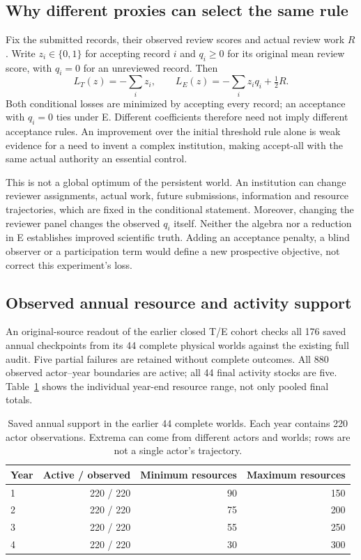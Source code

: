 \subsection{Why different proxies can select the same rule}
Fix the submitted records, their observed review scores and actual review
work $R$. Write $z_i\in\{0,1\}$ for accepting record $i$ and $q_i\geq0$ for
its original mean review score, with $q_i=0$ for an unreviewed record. Then
\begin{equation}
 L_T(z)=-\sum_i z_i,\qquad
 L_E(z)=-\sum_i z_i q_i+\tfrac12 R.
 \label{eq:conditional-accept-all}
\end{equation}
Both conditional losses are minimized by accepting every record; an acceptance
with $q_i=0$ ties under E. Different coefficients therefore need not imply
different acceptance rules. An improvement over the initial threshold rule
alone is weak evidence for a need to invent a complex institution, making
accept-all with the same actual authority an essential control.

This is not a global optimum of the persistent world. An institution can
change reviewer assignments, actual work, future submissions, information and
resource trajectories, which are fixed in the conditional statement.
Moreover, changing the reviewer panel changes the observed $q_i$ itself.
Neither the algebra nor a reduction in E establishes improved scientific
truth. Adding an acceptance penalty, a blind observer or a participation term
would define a new prospective objective, not correct this experiment's loss.

\subsection{Observed annual resource and activity support}
An original-source readout of the earlier closed T/E cohort checks all 176
saved annual checkpoints from its 44 complete physical worlds against the
existing full audit. Five partial failures are retained without complete
outcomes. All 880 observed actor--year boundaries are active; all 44 final
activity stocks are five. Table~\ref{tab:native-resource-support} shows the
individual year-end resource range, not only pooled final totals.

\begin{table}[htbp]\centering\small
\caption{Saved annual support in the earlier 44 complete worlds. Each year
contains 220 actor observations. Extrema can come from different actors and
worlds; rows are not a single actor's trajectory.}
\label{tab:native-resource-support}
\begin{tabular}{@{}lrrr@{}}
\toprule Year & Active / observed & Minimum resources & Maximum resources\\\midrule
1 & 220 / 220 & 90 & 150\\
2 & 220 / 220 & 75 & 200\\
3 & 220 / 220 & 55 & 250\\
4 & 220 / 220 & 30 & 300\\\bottomrule
\end{tabular}\end{table}

